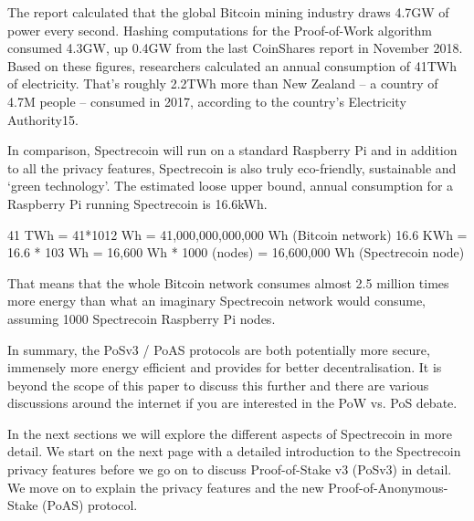 The report calculated that the global Bitcoin mining industry draws 4.7GW of
power every second. Hashing computations for the Proof-of-Work algorithm
consumed 4.3GW, up 0.4GW from the last CoinShares report in November 2018.
Based on these figures, researchers calculated an annual consumption of
41TWh of electricity. That’s roughly 2.2TWh more than New Zealand – a country
of 4.7M people – consumed in 2017, according to the country’s Electricity
Authority15.



In comparison, Spectrecoin will run on a standard Raspberry Pi and in addition
to all the privacy features, Spectrecoin is also truly eco-friendly, sustainable
and ‘green technology’. The estimated loose upper bound, annual consumption for
a Raspberry Pi running Spectrecoin is 16.6kWh.



41 TWh = 41*1012 Wh = 41,000,000,000,000 Wh (Bitcoin network) 16.6 KWh = 16.6 * 103 Wh = 16,600 Wh * 1000 (nodes) = 16,600,000 Wh (Spectrecoin node) 



That means that the whole Bitcoin network consumes almost 2.5 million times
more energy than what an imaginary Spectrecoin network would consume, assuming
1000 Spectrecoin Raspberry Pi nodes.




In summary, the PoSv3 / PoAS protocols are both potentially more secure,
immensely more energy efficient and provides for better decentralisation.
It is beyond the scope of this paper to discuss this further and there are
various discussions around the internet if you are interested in the PoW vs.
PoS debate.



In the next sections we will explore the different aspects of Spectrecoin in
more detail. We start on the next page with a detailed introduction to the
Spectrecoin privacy features before we go on to discuss Proof-of-Stake v3
(PoSv3) in detail. We move on to explain the privacy features and the new
Proof-of-Anonymous-Stake (PoAS) protocol.